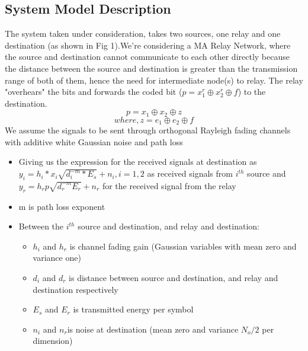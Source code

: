 \documentclass[conference]{IEEEtran}
\begin{document}
\subsection{System Model Description}
The system taken under consideration, takes two sources, one relay and one destination (as shown in Fig 1\label{fig1}).We're considering a MA Relay Network, where the source and destination cannot communicate to each other directly because the distance between the source and destination is greater than the transmission range of both of them, hence the need for intermediate node(s) to relay. The relay "overhears" the bits and forwards the coded bit ($p=x_1^r\oplus x_2^r \oplus f$) to the destination. 
\begin{equation}
p = x_1\oplus x_2 \oplus z
\end{equation}
\[where,  z = e_1 \oplus e_2 \oplus f\]
We assume the signals to be sent through orthogonal Rayleigh fading channels with additive white Gaussian noise and path loss
\begin{itemize}
\item Giving us the expression for the received signals at destination as $y_i = h_i*x_i \sqrt{d_i^{-m}* E_s}+n_i , i =1,2$ as received signals from $i^{th}$ source and $y_r = h_r p \sqrt{d_r^{-m} E_r}+n_r$ for the received signal from the relay
\item m is path loss exponent
\item Between the  $i^{th}$ source and destination, and relay and destination:
\begin{itemize}
\item $h_i$ and $h_r$ is channel fading gain (Gaussian variables with mean zero and variance one)
\item $d_i$ and $d_r$ is distance between source and destination, and relay and destination respectively
\item  $E_s$ and  $E_r$ is transmitted energy per symbol
\item  $n_i$ and $n_r$is noise at destination (mean zero and variance $N_o/2$ per dimension)
\end{itemize}


\end{itemize}
\end{document}
